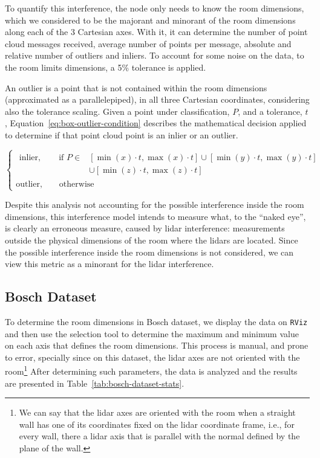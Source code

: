 To quantify this interference, the node only needs to know the room dimensions, which we considered to be the majorant and minorant of the room dimensions along each of the 3 Cartesian axes. With it, it can determine the number of point cloud messages received, average number of points per message, absolute and relative number of outliers and inliers. To account for some noise on the data, to the room limits dimensions, a 5\% tolerance is applied. 

An outlier is a point that is not contained within the room dimensions (approximated as a parallelepiped), in all three Cartesian coordinates, considering also the tolerance scaling. Given a point under classification, $P$, and a tolerance, $t$, Equation~\eqref{eq:box-outlier-condition} describes the mathematical decision applied to determine if that point cloud point is an inlier or an outlier.

\begin{equation}
\label{eq:box-outlier-condition}
\begin{cases}
	\begin{aligned}
		\text{inlier}, \qquad \text{if\ } P \in & [\min(x) \cdot t, \max(x) \cdot t] \cup [\min(y) \cdot t, \max(y) \cdot t]  \\
																					&					 \cup [\min(z) \cdot t, \max(z) \cdot t] 
	\end{aligned} \\
	\text{outlier}, \qquad \text{otherwise}
\end{cases}
\end{equation}

Despite this analysis not accounting for the possible interference inside the room dimensions, this interference model intends to measure what, to the ``naked eye'', is clearly an erroneous measure, caused by \ac{lidar} interference: measurements outside the physical dimensions of the room where the \acp{lidar} are located. Since the possible interference inside the room dimensions is not considered, we can view this metric as a minorant for the \ac{lidar} interference.


\subsection{Bosch Dataset}
\label{subsec:lidar-interference:room-outliers-bosch}
To determine the room dimensions in Bosch dataset, we display the data on \texttt{RViz} and then use the selection tool to determine the maximum and minimum value on each axis that defines the room dimensions. This process is manual, and prone to error, specially since on this dataset, the \ac{lidar} axes are not oriented with the room\footnote{We can say that the \ac{lidar} axes are oriented with the room when a straight wall has one of its coordinates fixed on the \ac{lidar} coordinate frame, i.e., for every wall, there a \ac{lidar} axis that is parallel with the normal defined by the plane of the wall.} After determining such parameters, the data is analyzed and the results are presented in Table~\ref{tab:bosch-dataset-stats}.


